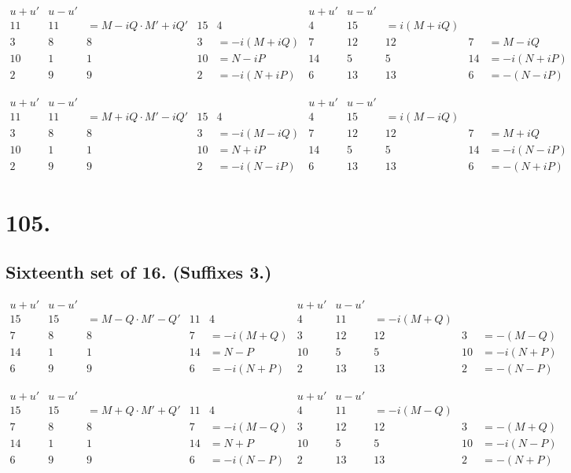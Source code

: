 \documentclass[11pt,a4paper]{book}
\begin{document}
\[
\begin{array}{c|cccc|c|cccc}
u+u' & u-u' & & & & u+u' & u-u' & & & \\
\hline
11 & 11 & = M-iQ \cdot M'+iQ' & 15 & 4 & 4 & 15 & = i(M+iQ) \\
3 & 8 & 8 & 3 & = -i(M+iQ) & 7 & 12 & 12 & 7 & = M-iQ \\
10 & 1 & 1 & 10 & = N-iP & 14 & 5 & 5 & 14 & = -i(N+iP) \\
2 & 9 & 9 & 2 & = -i(N+iP) & 6 & 13 & 13 & 6 & = -(N-iP)
\end{array}
\]

\[
\begin{array}{c|cccc|c|cccc}
u+u' & u-u' & & & & u+u' & u-u' & & & \\
\hline
11 & 11 & = M+iQ \cdot M'-iQ' & 15 & 4 & 4 & 15 & = i(M-iQ) \\
3 & 8 & 8 & 3 & = -i(M-iQ) & 7 & 12 & 12 & 7 & = M+iQ \\
10 & 1 & 1 & 10 & = N+iP & 14 & 5 & 5 & 14 & = -i(N-iP) \\
2 & 9 & 9 & 2 & = -i(N-iP) & 6 & 13 & 13 & 6 & = -(N+iP)
\end{array}
\]

\newpage
\section*{105.}
\label{sec:105}

\subsection*{Sixteenth set of 16. (Suffixes 3.)}

\[
\begin{array}{c|cccc|c|cccc}
u+u' & u-u' & & & & u+u' & u-u' & & & \\
\hline
15 & 15 & = M-Q \cdot M'-Q' & 11 & 4 & 4 & 11 & = -i(M+Q) \\
7 & 8 & 8 & 7 & = -i(M+Q) & 3 & 12 & 12 & 3 & = -(M-Q) \\
14 & 1 & 1 & 14 & = N-P & 10 & 5 & 5 & 10 & = -i(N+P) \\
6 & 9 & 9 & 6 & = -i(N+P) & 2 & 13 & 13 & 2 & = -(N-P)
\end{array}
\]

\[
\begin{array}{c|cccc|c|cccc}
u+u' & u-u' & & & & u+u' & u-u' & & & \\
\hline
15 & 15 & = M+Q \cdot M'+Q' & 11 & 4 & 4 & 11 & = -i(M-Q) \\
7 & 8 & 8 & 7 & = -i(M-Q) & 3 & 12 & 12 & 3 & = -(M+Q) \\
14 & 1 & 1 & 14 & = N+P & 10 & 5 & 5 & 10 & = -i(N-P) \\
6 & 9 & 9 & 6 & = -i(N-P) & 2 & 13 & 13 & 2 & = -(N+P)
\end{array}
\]
\end{document}
